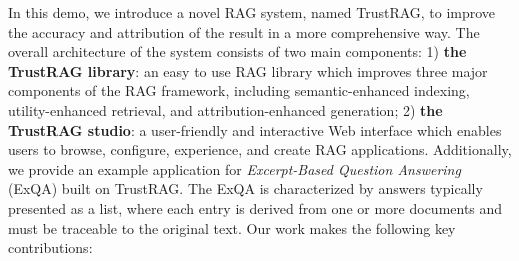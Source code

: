 In this demo, we introduce a novel \ac{RAG} system, named TrustRAG, to improve the accuracy and attribution of the result in a more comprehensive way. The overall architecture of the system consists of two main components: 
1) \textbf{the TrustRAG library}: an easy to use \ac{RAG} library which improves three major components of the RAG framework, including semantic-enhanced indexing, utility-enhanced retrieval, and attribution-enhanced generation; 
2) \textbf{the TrustRAG studio}: a user-friendly and interactive Web interface which enables users to browse, configure, experience, and create RAG applications.
Additionally, we provide an example application for \textit{Excerpt-Based Question Answering} (ExQA) built on TrustRAG. The ExQA is characterized by answers typically presented as a list, where each entry is derived from one or more documents and must be traceable to the original text. 
Our work makes the following key contributions:

